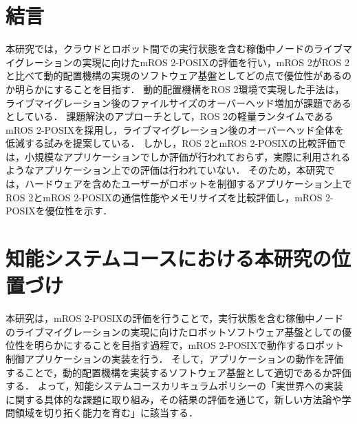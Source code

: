 \documentclass[11pt]{ujarticle}
\begin{document}
\section{結言}
本研究では，クラウドとロボット間での実行状態を含む稼働中ノードのライブマイグレーションの実現に向けたmROS 2-POSIXの評価を行い，mROS 2がROS 2と比べて動的配置機構の実現のソフトウェア基盤としてどの点で優位性があるのか明らかにすることを目指す．
動的配置機構をROS 2環境で実現した手法は，ライブマイグレーション後のファイルサイズのオーバーヘッド増加が課題であるとしている．
課題解決のアプローチとして，ROS 2の軽量ランタイムであるmROS 2-POSIXを採用し，ライブマイグレーション後のオーバーヘッド全体を低減する試みを提案している．
しかし，ROS 2とmROS 2-POSIXの比較評価では，小規模なアプリケーションでしか評価が行われておらず，実際に利用されるようなアプリケーション上での評価は行われていない．
そのため，本研究では，ハードウェアを含めたユーザーがロボットを制御するアプリケーション上でROS 2とmROS 2-POSIXの通信性能やメモリサイズを比較評価し，mROS 2-POSIXを優位性を示す．

\section{知能システムコースにおける本研究の位置づけ}
本研究は，mROS 2-POSIXの評価を行うことで，実行状態を含む稼働中ノードのライブマイグレーションの実現に向けたロボットソフトウェア基盤としての優位性を明らかにすることを目指す過程で，mROS 2-POSIXで動作するロボット制御アプリケーションの実装を行う．
そして，アプリケーションの動作を評価することで，動的配置機構を実装するソフトウェア基盤として適切であるか評価する．
よって，知能システムコースカリキュラムポリシーの「実世界への実装に関する具体的な課題に取り組み，その結果の評価を通じて，新しい方法論や学問領域を切り拓く能力を育む」に該当する．
\end{document}

